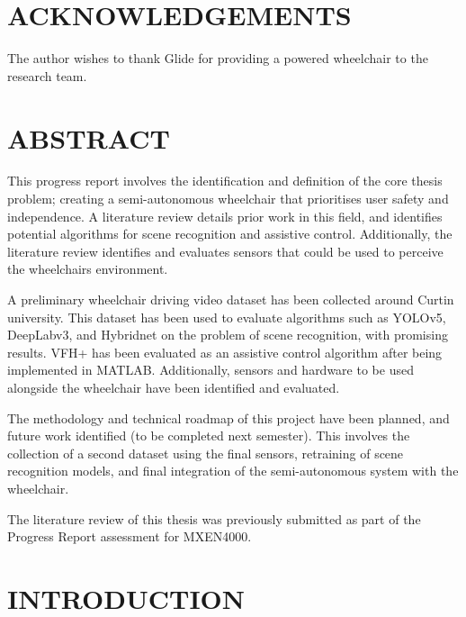 \documentclass[12pt,twoside]{article}
\begin{document}

\thispagestyle{empty}\null\clearpage


\thispagestyle{empty}\null\clearpage

\section*{ACKNOWLEDGEMENTS}
The author wishes to thank Glide for providing a powered wheelchair to the research team.
\cleardoublepage

\section*{ABSTRACT}
This progress report involves the identification and definition of the core thesis problem;
creating a semi-autonomous wheelchair that prioritises user safety and independence.
A literature review details prior work in this field, and identifies potential algorithms
for scene recognition and assistive control. Additionally, the literature review identifies and evaluates
sensors that could be used to perceive the wheelchairs environment.

A preliminary wheelchair driving video dataset has been collected around Curtin university.
This dataset has been used to evaluate algorithms such as YOLOv5, DeepLabv3, and Hybridnet on
the problem of scene recognition, with promising results. VFH+ has been evaluated as an assistive
control algorithm after being implemented in MATLAB. Additionally, sensors and hardware to be used
alongside the wheelchair have been identified and evaluated.

The methodology and technical roadmap of this project have been planned, and future work identified (to be completed
next semester). This involves the collection of a second dataset using the final sensors, retraining of
scene recognition models, and final integration of the semi-autonomous system with the wheelchair.

The literature review of this thesis was previously submitted as part of the Progress Report assessment for MXEN4000.
\cleardoublepage

\renewcommand{\contentsname}{TABLE OF CONTENTS}
\tableofcontents
\pagebreak
\listoffigures
\listoftables
\cleardoublepage
{}

\section{INTRODUCTION}

\cleardoublepage
\end{document}
